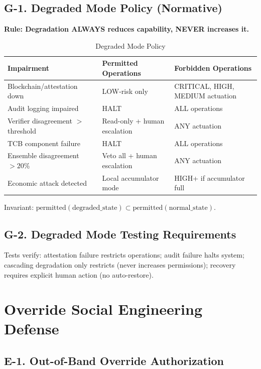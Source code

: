 \documentclass[11pt,letterpaper]{article}
\theoremstyle{definition}
\theoremstyle{remark}
\begin{document}
\subsection{G-1. Degraded Mode Policy (Normative)}

\textbf{Rule: Degradation ALWAYS reduces capability, NEVER increases it.}

\begin{table}[h]
\centering
\small
\begin{tabular}{@{}lll@{}}
\toprule
\textbf{Impairment} & \textbf{Permitted Operations} & \textbf{Forbidden Operations} \\
\midrule
Blockchain/attestation down & LOW-risk only & CRITICAL, HIGH, MEDIUM actuation \\
Audit logging impaired & HALT & ALL operations \\
Verifier disagreement $>$ threshold & Read-only + human escalation & ANY actuation \\
TCB component failure & HALT & ALL operations \\
Ensemble disagreement $> 20$\% & Veto all + human escalation & ANY actuation \\
Economic attack detected & Local accumulator mode & HIGH+ if accumulator full \\
\bottomrule
\end{tabular}
\caption{Degraded Mode Policy}
\end{table}

Invariant: $\text{permitted}(\text{degraded\_state}) \subset \text{permitted}(\text{normal\_state})$.

\subsection{G-2. Degraded Mode Testing Requirements}

Tests verify: attestation failure restricts operations; audit failure halts system; cascading degradation only restricts (never increases permissions); recovery requires explicit human action (no auto-restore).


\section{Override Social Engineering Defense}

\subsection{E-1. Out-of-Band Override Authorization}
\end{document}
